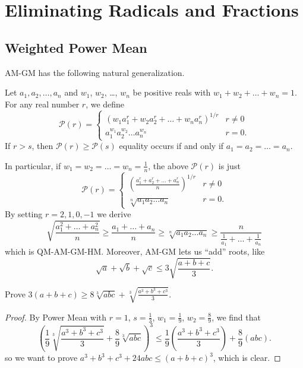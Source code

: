 \documentclass[11pt]{scrartcl}
\begin{document}
\section{Eliminating Radicals and Fractions}
\subsection{Weighted Power Mean}
AM-GM has the following natural generalization.
\begin{theorem}
	 Let $a_1, a_2, \dots, a_n$ and $w_1$, $w_2$, \dots, $w_n$  be positive reals with $w_1+w_2+\dots+w_n=1$.
	For any real number $r$, we define
	\[ \mathcal P(r) =
		\begin{cases}
			\left( w_1 a_1^r + w_2 a_2^r + \dots + w_n a_n^r \right)^{1/r} & r \neq 0 \\[1em]
			a_1^{w_1} a_2^{w_2} \dots a_n^{w_n} & r = 0. 
		\end{cases}
	\]
	If $r>s$, then $\mathcal P(r) \ge \mathcal P(s)$ equality occurs if and only if $a_1 = a_2 = \dots = a_n$.
\end{theorem}
In particular, if $w_1 = w_2 = \dots = w_n = \frac 1n$, the above $\mathcal P(r)$ is just
	\[ \mathcal P(r) =
		\begin{cases}
			\left( \displaystyle\frac{a_1^r + a_2^r + \dots + a_n^r}{n} \right)^{1/r} & r \neq 0 \\[1.5em]
			\sqrt[n]{a_1a_2 \dots a_n} & r = 0. 
		\end{cases}
	\]
By setting $r=2,1,0,-1$ we derive
\[ \sqrt{\frac{a_1^2+\dots+a_n^2}{n}}
	\ge \frac{a_1+\dots+a_n}{n}
	\ge \sqrt[n]{a_1a_2 \dots a_n} 
	\ge \frac{n}{\frac{1}{a_1} + \dots + \frac{1}{a_n}} \]
which is QM-AM-GM-HM. Moreover, AM-GM lets us ``add'' roots, like
\[ \sqrt a + \sqrt b + \sqrt c \le 3\sqrt{\frac{a+b+c}{3}}. \]

\begin{example}
	 Prove $3(a+b+c) \ge 8\sqrt[3]{abc} + \sqrt[3]{\frac{a^3+b^3+c^3}{3}}$.
\end{example}
\begin{proof}
	By Power Mean with $r=1$, $s=\frac 13$, $w_1 = \frac 19$, $w_2 = \frac 89$, we find that
	\[ \left( \frac 19 \sqrt[3]{\frac{a^3+b^3+c^3}{3}} + \frac 89 \sqrt[3]{abc} \right)^3
	\le \frac19 \left( \frac{a^3+b^3+c^3}{3} \right) + \frac 89 \left( abc \right). \]
	so we want to prove $a^3+b^3+c^3+24abc \le (a+b+c)^3$, which is clear.
\end{proof}
\end{document}
